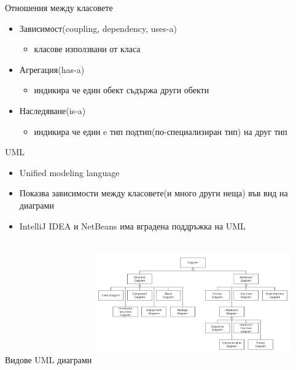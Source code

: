 \documentclass{beamer}
\begin{document}
\begin{frame}{Отношения между класовете}
  \transdissolve
  \begin{itemize}
  \item Зависимост(coupling, dependency, uses-a) \pause
    \begin{itemize}
    \item класове използвани от класа \pause
    \end{itemize}
  \item Агрегация(has-a) \pause
    \begin{itemize}
    \item индикира че един обект съдържа други обекти \pause
    \end{itemize}
  \item Наследяване(is-a) \pause
    \begin{itemize}
    \item индикира че един e тип подтип(по-специализиран тип) на друг тип
    \end{itemize}
  \end{itemize}
\end{frame}

\begin{frame}{UML}
  \transdissolve
  \begin{itemize}
  \item Unified modeling language \pause
  \item Показва зависимости между класовете(и много други неща) във
    вид на диаграми \pause
  \item IntelliJ IDEA и NetBeans има вградена поддръжка на UML
  \end{itemize}
\end{frame}

\begin{frame}{Видове UML диаграми}
  \transdissolve
  \includegraphics[width=320px, height=200px]{images/uml-diagram.png}
\end{frame}
\end{document}
